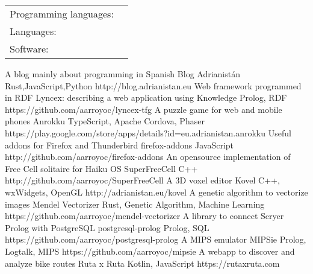 \documentclass[]{awesome-cv}
\begin{document}
\begin{cventries}
	\cventry
	{}
	{\def\arraystretch{1.15}{\begin{tabular}{ l l }
		Programming languages:  & {\skill{ Rust, C, Python, Java, JavaScript, SQL, Prolog, Kotlin}} \\
		Languages:  & {\skill{ Spanish (native), English (FIRST B2)}} \\
		Software: & {\skill{Linux, Kubernetes, Docker, Azure, AWS, \LaTeX , PostgreSQL, Emacs, Microsoft Office, Git}} \\
		\end{tabular}}}
	{}
	{}
	{}
\end{cventries}

\vspace{-7mm}
\begin{cventries}
	\cventry
	{A blog mainly about programming in Spanish}
	{Blog Adrianistán}
	{Rust,JavaScript,Python}
	{http://blog.adrianistan.eu}
	{}
	\cventry
    {Web framework programmed in RDF}
    {Lyncex: describing a web application using Knowledge}
    {Prolog, RDF}
    {https://github.com/aarroyoc/lyncex-tfg}
    {}
	\cventry
	{A puzzle game for web and mobile phones}
	{Anrokku}
	{TypeScript, Apache Cordova, Phaser}
	{}
	{https://play.google.com/store/apps/details?id=eu.adrianistan.anrokku}
	\cventry
	{Useful addons for Firefox and Thunderbird}
	{firefox-addons}
	{JavaScript}
	{http://github.com/aarroyoc/firefox-addons}
	{}
	\cventry
	{An opensource implementation of Free Cell solitaire for Haiku OS}
	{SuperFreeCell}
	{C++}
	{http://github.com/aarroyoc/SuperFreeCell}
	{}
	\cventry
	{A 3D voxel editor}
	{Kovel}
	{C++, wxWidgets, OpenGL}
	{http://adrianistan.eu/kovel}
	{}
	\cventry
	{A genetic algorithm to vectorize images}
	{Mendel Vectorizer}
	{Rust, Genetic Algorithm, Machine Learning}
	{https://github.com/aarroyoc/mendel-vectorizer}
	{}
        \cventry
            {A library to connect Scryer Prolog with PostgreSQL}
            {postgresql-prolog}
            {Prolog, SQL}
            {https://github.com/aarroyoc/postgresql-prolog}
            {}
        \cventry
            {A MIPS emulator}
            {MIPSie}
            {Prolog, Logtalk, MIPS}
            {https://github.com/aarroyoc/mipsie}
            {}
        \cventry
            {A webapp to discover and analyze bike routes}
            {Ruta x Ruta}
            {Kotlin, JavaScript}
            {https://rutaxruta.com}
            {}            

	\vspace{-5mm}
\end{cventries}
\end{document}

